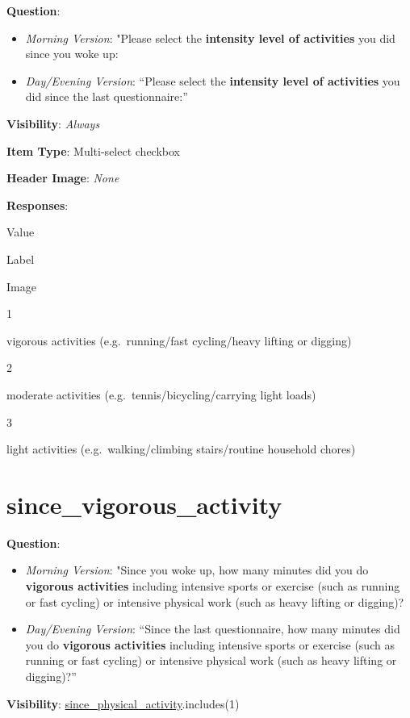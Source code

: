 \documentclass[]{book}
\providecommand{\tightlist}{%
  \setlength{\itemsep}{0pt}\setlength{\parskip}{0pt}}
\begin{document}
\textbf{Question}:

\begin{itemize}
\tightlist
\item
  \emph{Morning Version}: "Please select the \textbf{intensity level of activities} you did since you woke up:
\item
  \emph{Day/Evening Version}: ``Please select the \textbf{intensity level of activities} you did since the last questionnaire:''
\end{itemize}

\textbf{Visibility}: \emph{Always}

\textbf{Item Type}: Multi-select checkbox

\textbf{Header Image}: \emph{None}

\textbf{Responses}:

Value

Label

Image

1

vigorous activities (e.g.~running/fast cycling/heavy lifting or digging)

2

moderate activities (e.g.~tennis/bicycling/carrying light loads)

3

light activities (e.g.~walking/climbing stairs/routine household chores)

\hypertarget{since_vigorous_activity}{%
\section{since\_vigorous\_activity}\label{since_vigorous_activity}}

\textbf{Question}:

\begin{itemize}
\tightlist
\item
  \emph{Morning Version}: "Since you woke up, how many minutes did you do \textbf{vigorous activities} including intensive sports or exercise (such as running or fast cycling) or intensive physical work (such as heavy lifting or digging)?
\item
  \emph{Day/Evening Version}: ``Since the last questionnaire, how many minutes did you do \textbf{vigorous activities} including intensive sports or exercise (such as running or fast cycling) or intensive physical work (such as heavy lifting or digging)?''
\end{itemize}

\textbf{Visibility}: \protect\hyperlink{since_physical_activity}{since\_physical\_activity}.includes(1)
\end{document}
